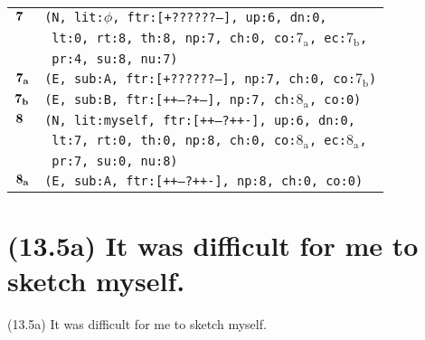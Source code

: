 \documentclass{article}
\begin{document}
\begin{minipage}{\textwidth}
{\begin{tabular}{|r|l|}
    ${\textbf{\textrm{7}}_{\phantom{z}}}$ & \texttt{\texttt{(N,~lit:$\phi$,~ftr:[+??????--],~up:6,~dn:0,}} \\
    & \texttt{\texttt{~lt:0,~rt:8,~th:8,~np:7,~ch:0,~co:${\textrm{7}_{\textrm{a}}}$,~ec:${\textrm{7}_{\textrm{b}}}$,}} \\
    & \texttt{\texttt{~pr:4,~su:8,~nu:7)}} \\
    ${\textbf{\textrm{7}}_{\textbf{\textrm{a}}}}$ & \texttt{\texttt{(E,~sub:A,~ftr:[+??????--],~np:7,~ch:0,~co:${\textrm{7}_{\textrm{b}}}$)}} \\
    ${\textbf{\textrm{7}}_{\textbf{\textrm{b}}}}$ & \texttt{\texttt{(E,~sub:B,~ftr:[++---?+--],~np:7,~ch:${\textrm{8}_{\textrm{a}}}$,~co:0)}} \\
    ${\textbf{\textrm{8}}_{\phantom{z}}}$ & \texttt{\texttt{(N,~lit:myself,~ftr:[++---?++-],~up:6,~dn:0,}} \\
    & \texttt{\texttt{~lt:7,~rt:0,~th:0,~np:8,~ch:0,~co:${\textrm{8}_{\textrm{a}}}$,~ec:${\textrm{8}_{\textrm{a}}}$,}} \\
    & \texttt{\texttt{~pr:7,~su:0,~nu:8)}} \\
    ${\textbf{\textrm{8}}_{\textbf{\textrm{a}}}}$ & \texttt{\texttt{(E,~sub:A,~ftr:[++---?++-],~np:8,~ch:0,~co:0)}} \\
    \hline
  \end{tabular}
  }
\end{minipage}
\bigbreak

\clearpage

%
%

\section*{(13.5a) It was difficult for me to sketch myself.}

\bigbreak
\begin{enumerate*}
\item[(13.5a)] It was difficult for me to sketch myself.
\end{enumerate*}
\bigbreak
\end{document}
